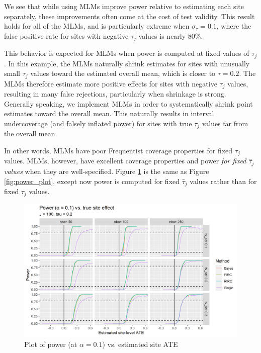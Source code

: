 \documentclass[]{article}
\begin{document}
We see that while using MLMs improve power relative to estimating each site separately, these improvements often come at the cost of test validity.
This result holds for all of the MLMs, and is particularly extreme when $\sigma_\tau = 0.1$, where the false positive rate for sites with negative $\tau_j$ values is nearly 80\%.

This behavior is expected for MLMs when power is computed at fixed values of $\tau_j$.
In this example, the MLMs naturally shrink estimates for sites with unusually small $\tau_j$ values toward the estimated overall mean, which is closer to $\tau = 0.2$.
The MLMs therefore estimate more positive effects for sites with negative $\tau_j$ values, resulting in many false rejections, particularly when shrinkage is strong.
Generally speaking, we implement MLMs in order to systematically shrink point estimates toward the overall mean.
This naturally results in interval undercoverage (and falsely inflated power) for sites with true $\tau_j$ values far from the overall mean.

In other words, MLMs have poor Frequentist coverage properties for fixed $\tau_j$ values.
MLMs, however, have excellent coverage properties and power \textit{for fixed $\hat{\tau}_j$ values} when they are well-specified.
Figure \ref{fig:power_plot_cond} is the same as Figure \ref{fig:power_plot}, except now power is computed for fixed $\hat{\tau}_j$ values rather than for fixed $\tau_j$ values.
\begin{figure}[ht]
	\centering
	\includegraphics[width=\textwidth]{cond_power_1sided}
	\caption{Plot of power (at $\alpha = 0.1$) vs. estimated site ATE}
	\label{fig:power_plot_cond}
\end{figure}
\end{document}
